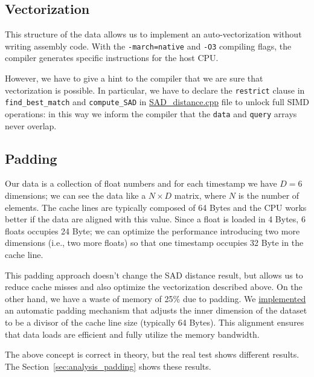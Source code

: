 \subsection{Vectorization}
This structure of the data allows us to implement an auto-vectorization without writing assembly code. With the \texttt{-march=native} and \texttt{-O3} compiling flags, the compiler generates specific instructions for the host CPU.

However, we have to give a hint to the compiler that we are sure that vectorization is possible. In particular, we have to declare the \texttt{restrict} clause in \texttt{find\_best\_match} and \texttt{compute\_SAD} in \href{https://github.com/edoardosarri24/time-series-pattern-recognition/blob/master/sequential/src/SAD_distance.cpp}{SAD\_distance.cpp} file to unlock full SIMD operations: in this way we inform the compiler that the \texttt{data} and \texttt{query} arrays never overlap.

\subsection{Padding}
\label{sec:seq_padding}

Our data is a collection of float numbers and for each timestamp we have $D=6$ dimensions; we can see the data like a $N\times D$ matrix, where $N$ is the number of elements. The cache lines are typically composed of 64 Bytes and the CPU works better if the data are aligned with this value. Since a float is loaded in 4 Bytes, 6 floats occupies 24 Byte; we can optimize the performance introducing two more dimensions (i.e., two more floats) so that one timestamp occupies 32 Byte in the cache line.

This padding approach doesn't change the SAD distance result, but allows us to reduce cache misses and also optimize the vectorization described above. On the other hand, we have a waste of memory of 25\% due to padding. We \href{https://github.com/edoardosarri24/time-series-pattern-recognition/blob/69a241f9725884cca0214c8def6c5e3164b437f2/sequential/include/common.hpp}{implemented} an automatic padding mechanism that adjusts the inner dimension of the dataset to be a divisor of the cache line size (typically 64 Bytes). This alignment ensures that data loads are efficient and fully utilize the memory bandwidth.

\myskip

The above concept is correct in theory, but the real test shows different results. The Section~\ref{sec:analysis_padding} shows these results.

